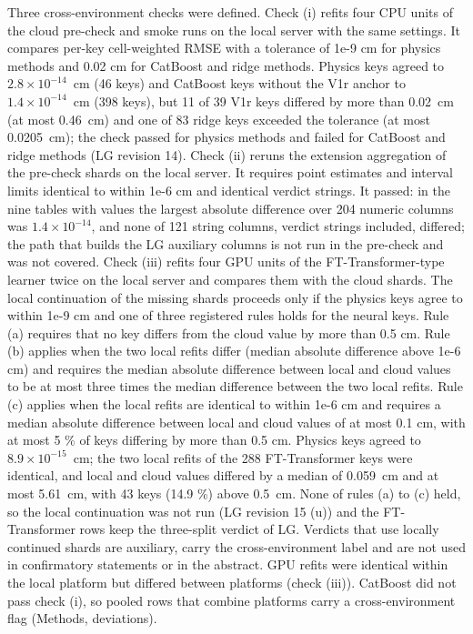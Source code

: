 Three cross-environment checks were defined. Check (i) refits four CPU units of the cloud pre-check and smoke runs on the local server with the same settings. It compares per-key cell-weighted RMSE with a tolerance of 1e-9 cm for physics methods and 0.02 cm for CatBoost and ridge methods. Physics keys agreed to $2.8\times10^{-14}$~cm (46 keys) and CatBoost keys without the V1r anchor to $1.4\times10^{-14}$~cm (398 keys), but 11 of 39 V1r keys differed by more than 0.02~cm (at most 0.46~cm) and one of 83 ridge keys exceeded the tolerance (at most 0.0205~cm); the check passed for physics methods and failed for CatBoost and ridge methods (LG revision 14). Check (ii) reruns the extension aggregation of the pre-check shards on the local server. It requires point estimates and interval limits identical to within 1e-6 cm and identical verdict strings. It passed: in the nine tables with values the largest absolute difference over 204 numeric columns was $1.4\times10^{-14}$, and none of 121 string columns, verdict strings included, differed; the path that builds the LG auxiliary columns is not run in the pre-check and was not covered. Check (iii) refits four GPU units of the FT-Transformer-type learner twice on the local server and compares them with the cloud shards. The local continuation of the missing shards proceeds only if the physics keys agree to within 1e-9 cm and one of three registered rules holds for the neural keys. Rule (a) requires that no key differs from the cloud value by more than 0.5 cm. Rule (b) applies when the two local refits differ (median absolute difference above 1e-6 cm) and requires the median absolute difference between local and cloud values to be at most three times the median difference between the two local refits. Rule (c) applies when the local refits are identical to within 1e-6 cm and requires a median absolute difference between local and cloud values of at most 0.1 cm, with at most 5 \% of keys differing by more than 0.5 cm. Physics keys agreed to $8.9\times10^{-15}$~cm; the two local refits of the 288 FT-Transformer keys were identical, and local and cloud values differed by a median of 0.059~cm and at most 5.61~cm, with 43 keys (14.9 \%) above 0.5~cm. None of rules (a) to (c) held, so the local continuation was not run (LG revision 15 (u)) and the FT-Transformer rows keep the three-split verdict of LG. Verdicts that use locally continued shards are auxiliary, carry the cross-environment label and are not used in confirmatory statements or in the abstract. GPU refits were identical within the local platform but differed between platforms (check (iii)). CatBoost did not pass check (i), so pooled rows that combine platforms carry a cross-environment flag (Methods, deviations).

